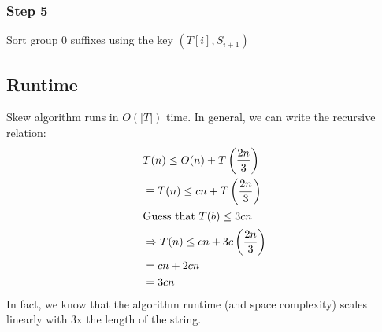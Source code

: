 \documentclass[10pt]{article}
\begin{document}
\subsubsection*{Step 5}
Sort group 0 suffixes using the key $(T[i], S_{i + 1})$

\subsection*{Runtime}
Skew algorithm runs in $O(|T|)$ time.  In general, we can write the recursive relation:
\begin{align*}
	&T(n) \leq O(n) + T\left(\frac{2n}{3}\right) \\
	&\equiv T(n) \leq cn + T\left(\frac{2n}{3}\right) \\
	\intertext{Guess that $T(b) \leq 3cn$}
	&\Rightarrow T(n) \leq cn + 3c \left(\frac{2n}{3} \right) \\
	&= cn + 2cn \\
	&= 3cn
\end{align*}
In fact, we know that the algorithm runtime (and space complexity) scales linearly with 3x the length of the string.
\end{document}
